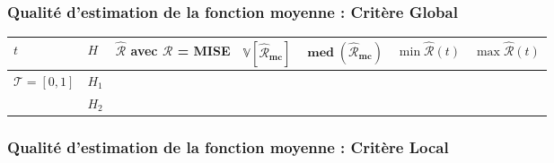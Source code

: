 \subsubsection{Qualité d'estimation de la fonction moyenne : Critère Global}

\begin{table}[H]
	\centering
	\begin{tabularx}{\linewidth}{|X|X|X|X|X|X|X|}
		\toprule
		$t$                                        & $H$   & $\widehat{\mathcal R}$ avec $\mathcal R$ = MISE & $\mathbf{\mathds V[\widehat{\mathcal R}_{mc}]}$ & $\mathbf{\operatorname{med}(\widehat{\mathcal R}_{mc})}$ & $\min \widehat{\mathcal R}(t)$ & $\max \widehat{\mathcal R}(t)$ \\
		\midrule
		\multirow{2}{\hsize}{$\mathcal T = [0,1]$} & $H_1$ &                                                 &                                                 &                                                          &                                &
		\\
		                                           & $H_2$ &                                                 &                                                 &                                                          &                                &
		\\
		\bottomrule
	\end{tabularx}
\end{table}

\subsubsection{Qualité d'estimation de la fonction moyenne : Critère Local}

